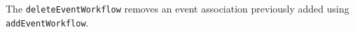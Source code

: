 The \verb+deleteEventWorkflow+ removes an event association previously added using \verb+addEventWorkflow+.
